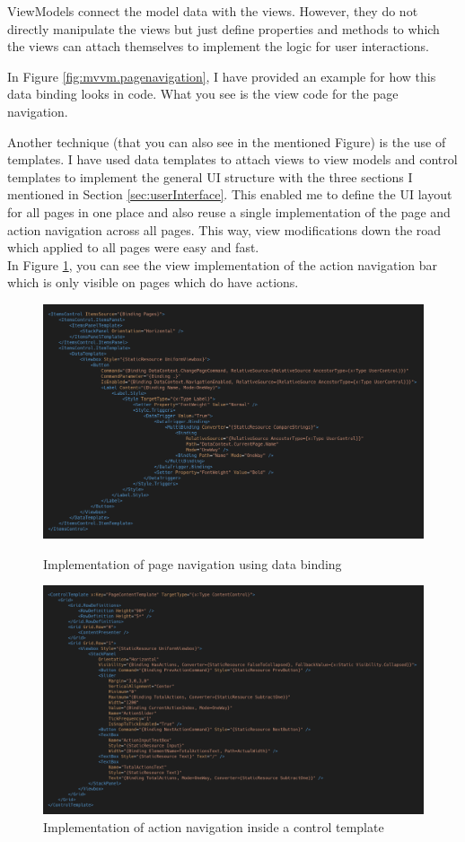 ViewModels connect the model data with the views. However, they do not directly manipulate the views but just define properties and methods to which the views can attach themselves to implement the logic for user interactions.

In Figure \ref{fig:mvvm.pagenavigation}, I have provided an example for how this data binding looks in code. What you see is the view code for the page navigation.

Another technique (that you can also see in the mentioned Figure) is the use of templates. I have used data templates to attach views to view models and control templates to implement the general UI structure with the three sections I mentioned in Section \ref{sec:userInterface}. This enabled me to define the UI layout for all pages in one place and also reuse a single implementation of the page and action navigation across all pages. This way, view modifications down the road which applied to all pages were easy and fast. \\ In Figure \ref{fig:mvvm.actionnavigation}, you can see the view implementation of the action navigation bar which is only visible on pages which do have actions.

\begin{figure}
\centering
\includegraphics[width=\textwidth]{figures/code/mvvm-arch/page-navigation-template.png}
\caption[Page navigation]{Implementation of page navigation using data binding}
\label{fig:mvvm.pagenavigation}
\includegraphics[width=\textwidth]{figures/code/mvvm-arch/action-navigation-template.png}
\caption[Action navigation]{Implementation of action navigation inside a control template}
\label{fig:mvvm.actionnavigation}
\end{figure}

